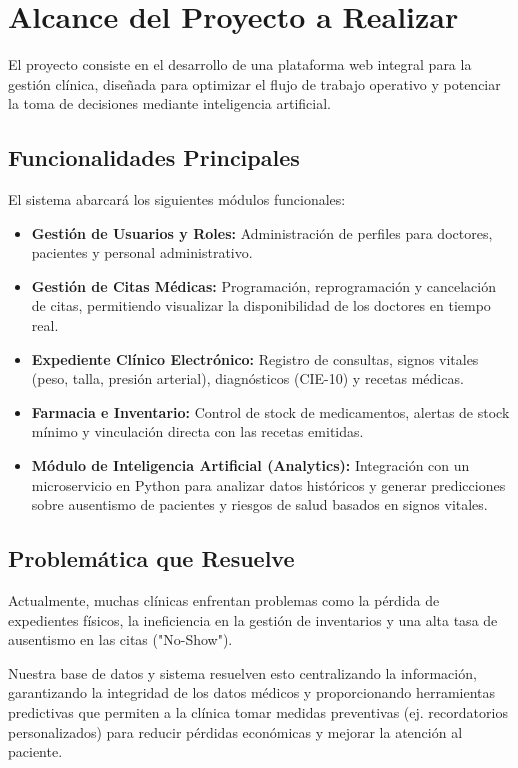 \documentclass[12pt, a4paper]{article}
\begin{document}
	\section{Alcance del Proyecto a Realizar}
	
	El proyecto consiste en el desarrollo de una plataforma web integral para la gestión clínica, diseñada para optimizar el flujo de trabajo operativo y potenciar la toma de decisiones mediante inteligencia artificial.
	
	\subsection{Funcionalidades Principales}
	El sistema abarcará los siguientes módulos funcionales:
	\begin{itemize}
		\item \textbf{Gestión de Usuarios y Roles:} Administración de perfiles para doctores, pacientes y personal administrativo.
		\item \textbf{Gestión de Citas Médicas:} Programación, reprogramación y cancelación de citas, permitiendo visualizar la disponibilidad de los doctores en tiempo real.
		\item \textbf{Expediente Clínico Electrónico:} Registro de consultas, signos vitales (peso, talla, presión arterial), diagnósticos (CIE-10) y recetas médicas.
		\item \textbf{Farmacia e Inventario:} Control de stock de medicamentos, alertas de stock mínimo y vinculación directa con las recetas emitidas.
		\item \textbf{Módulo de Inteligencia Artificial (Analytics):} Integración con un microservicio en Python para analizar datos históricos y generar predicciones sobre ausentismo de pacientes y riesgos de salud basados en signos vitales.
	\end{itemize}
	
	\subsection{Problemática que Resuelve}
	Actualmente, muchas clínicas enfrentan problemas como la pérdida de expedientes físicos, la ineficiencia en la gestión de inventarios y una alta tasa de ausentismo en las citas ("No-Show"). 
	
	Nuestra base de datos y sistema resuelven esto centralizando la información, garantizando la integridad de los datos médicos y proporcionando herramientas predictivas que permiten a la clínica tomar medidas preventivas (ej. recordatorios personalizados) para reducir pérdidas económicas y mejorar la atención al paciente.
	
\end{document}
